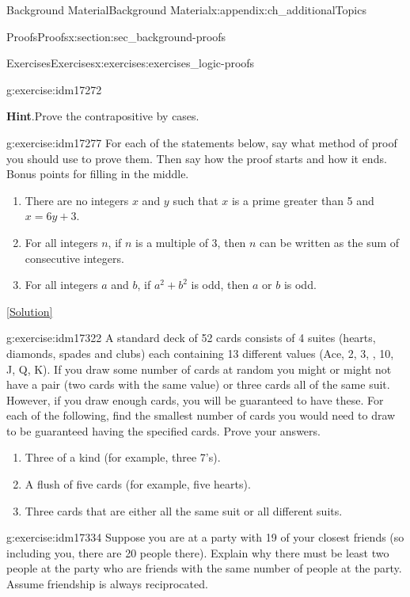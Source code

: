 \documentclass[oneside,10pt,]{book}
\numberwithin{equation}{chapter}
\begin{document}
\begin{appendixptx}{Background Material}{}{Background Material}{}{}{x:appendix:ch_additionalTopics}
\begin{sectionptx}{Proofs}{}{Proofs}{}{}{x:section:sec_background-proofs}
\begin{exercises-subsection}{Exercises}{}{Exercises}{}{}{x:exercises:exercises_logic-proofs}
\begin{divisionexercise}{14}{}{}{g:exercise:idm17272}
\par\smallskip%
\noindent\textbf{Hint}.\hypertarget{g:hint:idm17275}{}\quad{}Prove the contrapositive by cases.%
\end{divisionexercise}%
\begin{divisionexercise}{15}{}{}{g:exercise:idm17277}%
For each of the statements below, say what method of proof you should use to prove them. Then say how the proof starts and how it ends. Bonus points for filling in the middle.%
\par
%
\begin{enumerate}[label=(\alph*)]
\item{}There are no integers \(x\) and \(y\) such that \(x\) is a prime greater than 5 and \(x = 6y + 3\).%
\item{}For all integers \(n\), if \(n\) is a multiple of 3, then \(n\) can be written as the sum of consecutive integers.%
\item{}For all integers \(a\) and \(b\), if \(a^2 + b^2\) is odd, then \(a\) or \(b\) is odd.%
\end{enumerate}
%
\space\hspace*{0pt}\hfill{\tiny\hyperlink{g:solution:idm17300-main}{[Solution]}}\end{divisionexercise}%
\begin{divisionexercise}{16}{}{}{g:exercise:idm17322}%
A standard deck of 52 cards consists of 4 suites (hearts, diamonds, spades and clubs) each containing 13 different values (Ace, 2, 3, \textellipsis{}, 10, J, Q, K). If you draw some number of cards at random you might or might not have a pair (two cards with the same value) or three cards all of the same suit. However, if you draw enough cards, you will be guaranteed to have these. For each of the following, find the smallest number of cards you would need to draw to be guaranteed having the specified cards. Prove your answers.%
\par
%
\begin{enumerate}[label=(\alph*)]
\item{}Three of a kind (for example, three 7's). %
\item{}A flush of five cards (for example, five hearts). %
\item{}Three cards that are either all the same suit or all different suits. %
\end{enumerate}
%
\end{divisionexercise}%
\begin{divisionexercise}{17}{}{}{g:exercise:idm17334}%
Suppose you are at a party with 19 of your closest friends (so including you, there are 20 people there). Explain why there must be least two people at the party who are friends with the same number of people at the party. Assume friendship is always reciprocated.%

\end{divisionexercise}
\end{exercises-subsection}
\end{sectionptx}
\end{appendixptx}
\end{document}
